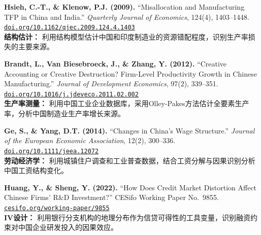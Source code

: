 \documentclass[12pt, a4paper]{article}
\begin{document}
\begin{enumerate}[label=\textbf{[\arabic*]}, leftmargin=*, itemsep=1em, start=18]

\item \textbf{Hsieh, C.-T., \& Klenow, P.J. (2009).}
  ``Misallocation and Manufacturing TFP in China and India.''
  \emph{Quarterly Journal of Economics}, 124(4), 1403--1448.\\
  \href{https://doi.org/10.1162/qjec.2009.124.4.1403}{\texttt{doi.org/10.1162/qjec.2009.124.4.1403}}\\
  {\small \textcolor{asher}{\textbf{结构估计：} 利用结构模型估计中国和印度制造业的资源错配程度，识别生产率损失的主要来源。}}

\item \textbf{Brandt, L., Van Biesebroeck, J., \& Zhang, Y. (2012).}
  ``Creative Accounting or Creative Destruction? Firm-Level Productivity Growth in Chinese Manufacturing.''
  \emph{Journal of Development Economics}, 97(2), 339--351.\\
  \href{https://doi.org/10.1016/j.jdeveco.2011.02.002}{\texttt{doi.org/10.1016/j.jdeveco.2011.02.002}}\\
  {\small \textcolor{asher}{\textbf{生产率测量：} 利用中国工业企业数据库，采用Olley-Pakes方法估计全要素生产率，分析中国制造业生产率增长来源。}}

\item \textbf{Ge, S., \& Yang, D.T. (2014).}
  ``Changes in China's Wage Structure.''
  \emph{Journal of the European Economic Association}, 12(2), 300--336.\\
  \href{https://doi.org/10.1111/jeea.12072}{\texttt{doi.org/10.1111/jeea.12072}}\\
  {\small \textcolor{asher}{\textbf{劳动经济学：} 利用城镇住户调查和工业普查数据，结合工资分解与因果识别分析中国工资结构变化。}}

\item \textbf{Huang, Y., \& Sheng, Y. (2022).}
  ``How Does Credit Market Distortion Affect Chinese Firms' R\&D Investment?''
  CESifo Working Paper No.\ 9855.\\
  \href{https://www.cesifo.org/en/publications/2022/working-paper/how-does-credit-market-distortion-affect-chinese-firms-rd}{\texttt{cesifo.org/working-paper/9855}}\\
  {\small \textcolor{asher}{\textbf{IV设计：} 利用银行分支机构的地理分布作为信贷可得性的工具变量，识别融资约束对中国企业研发投入的因果效应。}}

\end{enumerate}
\end{document}
